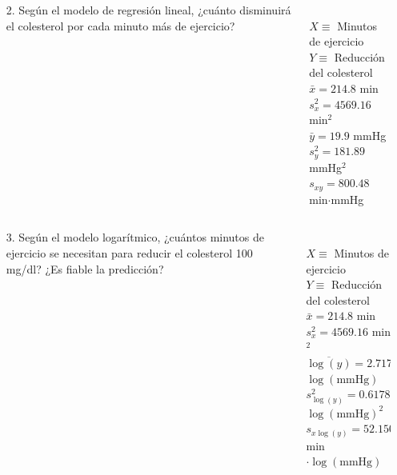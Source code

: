 \documentclass[aspectratio=149,10pt,t]{beamer}
\begin{document}
\begin{frame}
	\begin{columns}
		\begin{column}[T]{0.6\textwidth}
			\begin{enumerate}
				\item[2.] Según el modelo de regresión lineal, ¿cuánto disminuirá el colesterol por cada minuto más de ejercicio?
			\end{enumerate}
		\end{column}
		\begin{column}[T]{0.4\textwidth}
			\\
			$X\equiv$ Minutos de ejercicio\\
			$Y\equiv$ Reducción del colesterol\\
			$\bar x=214.8$ min\\
			$s_x^2=4569.16$ min$^2$\\
			$\bar y=19.9$ mmHg\\
			$s_y^2=181.89$ mmHg$^2$\\
			$s_{xy}=800.48$ min$\cdot$mmHg
		\end{column}
	\end{columns}
\end{frame}




\begin{frame}
	\begin{columns}
		\begin{column}[T]{0.6\textwidth}
			\begin{enumerate}
				\item[3.] Según el modelo logarítmico, ¿cuántos minutos de ejercicio se necesitan para reducir el colesterol 100 mg/dl?
			  ¿Es fiable la predicción?
			\end{enumerate}
		\end{column}
		\begin{column}[T]{0.4\textwidth}
			\structure{Datos}\\
			$X\equiv$ Minutos de ejercicio\\
			$Y\equiv$ Reducción del colesterol\\
			$\bar x=214.8$ min\\
			$s_x^2=4569.16$ min$^2$\\
			$\overline {\log(y)}=2.7177$ $\log(\mbox{mmHg})$\\
			$s_{\log(y)}^2=0.6178$ $\log(\mbox{mmHg})^2$\\
			$s_{x\log(y)}=52.1504$ min$\cdot\log(\mbox{mmHg})$
		\end{column}
	\end{columns}
\end{frame}
\end{document}
